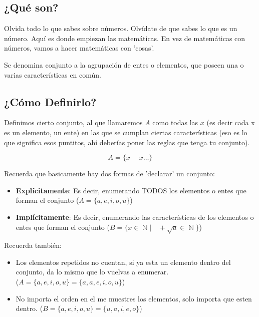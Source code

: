 \documentclass[12pt]{report}                                %
\DeclareMathOperator \Naturals {\mathbb{N}}                 %
\begin{document}
        \subsection{¿Qué son?}
            Olvida todo lo que sabes sobre números. Olvídate de que sabes lo que es un número.
            Aquí es donde empiezan las matemáticas. En vez de matemáticas con números,
            vamos a hacer matemáticas con 'cosas'.

            Se denomina conjunto a la agrupación de entes o elementos, que poseen una o
            varias características en común. 

        \clearpage
        \subsection{¿Cómo Definirlo?}

            Definimos cierto conjunto, al que llamaremos $A$ como todas las $x$ (es decir
            cada x es un elemento, un ente) en las que se cumplan ciertas características
            (eso es lo que significa esos puntitos, ahí deberías poner las reglas que tenga
            tu conjunto). 

            \begin{equation}   
                A = \{ x |\quad x \dots \}
            \end{equation}

            Recuerda que basicamente hay dos formas de 'declarar' un conjunto:
            \begin{itemize}
                \item \textbf{Explícitamente}:
                    Es decir, enumerando TODOS los elementos o entes que forman
                    el conjunto ($A = \{a, e, i, o, u\}$)

                \item \textbf{Implícitamente}:
                Es decir, enumerando las características de los elementos o entes que
                forman el conjunto ($B = \{ x \in \Naturals |\quad +\sqrt{a} \in \Naturals \}$)
            \end{itemize}


            Recuerda también:
            \begin{itemize}
                \item Los elementos repetidos no cuentan,
                    si ya esta un elemento dentro del conjunto, da lo mismo que lo vuelvas
                    a enumerar.\\
                    ($A = \{a, e, i, o, u\} = \{a, a, e, i, o, u\}$)

                \item No importa el orden en el me muestres los elementos,
                    solo importa que esten dentro.
                    ($B = \{a, e, i, o, u\} = \{u, a, i, e, o\}$)
            \end{itemize}
\end{document}
